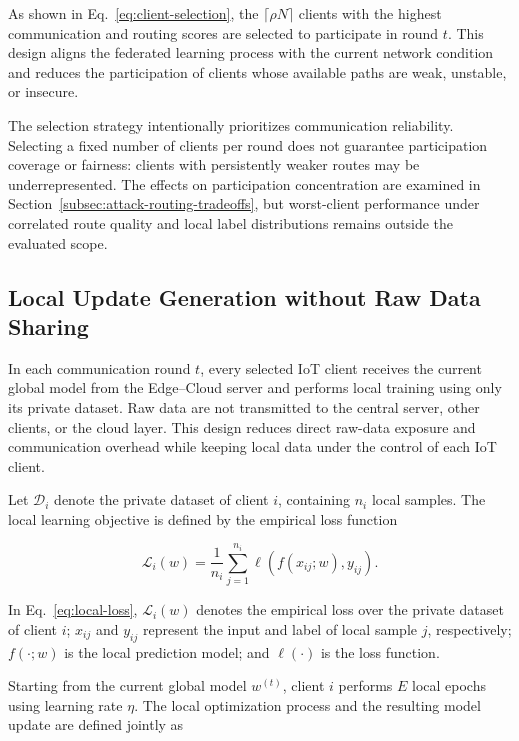 \documentclass[5p,times,numafflabel]{elsarticle}
\begin{document}
	As shown in Eq.~\eqref{eq:client-selection}, the
	\(\lceil\rho N\rceil\) clients with the highest communication and
	routing scores are selected to participate in round \(t\). This
	design aligns the federated learning process with the current network
	condition and reduces the participation of clients whose available
	paths are weak, unstable, or insecure.
	

The selection strategy intentionally prioritizes communication
reliability. Selecting a fixed number of clients per round does
not guarantee participation coverage or fairness: clients with
persistently weaker routes may be underrepresented. The effects
on participation concentration are examined in
Section~\ref{subsec:attack-routing-tradeoffs}, but worst-client
performance under correlated route quality and local label
distributions remains outside the evaluated scope.
	
	\subsection{Local Update Generation without Raw Data Sharing}
	\label{subsec:local-update}
	
	In each communication round \(t\), every selected IoT client receives
	the current global model from the Edge--Cloud server and performs
	local training using only its private dataset. Raw data are not
	transmitted to the central server, other clients, or the cloud layer.
	This design reduces direct raw-data exposure and communication
	overhead while keeping local data under the control of each IoT
	client.
	
	Let \(\mathcal{D}_{i}\) denote the private dataset of client \(i\),
	containing \(n_i\) local samples. The local learning objective is
	defined by the empirical loss function
	
	\begin{equation}
		\mathcal{L}_{i}(w)
		=
		\frac{1}{n_i}
		\sum_{j=1}^{n_i}
		\ell\left(f(x_{ij};w),y_{ij}\right).
		\label{eq:local-loss}
	\end{equation}
	
	In Eq.~\eqref{eq:local-loss}, \(\mathcal{L}_{i}(w)\) denotes the
	empirical loss over the private dataset of client \(i\);
	\(x_{ij}\) and \(y_{ij}\) represent the input and label of local
	sample \(j\), respectively; \(f(\cdot;w)\) is the local prediction
	model; and \(\ell(\cdot)\) is the loss function.
	
	Starting from the current global model \(w^{(t)}\), client \(i\)
	performs \(E\) local epochs using learning rate \(\eta\). The local
	optimization process and the resulting model update are defined
	jointly as
	
\end{document}

